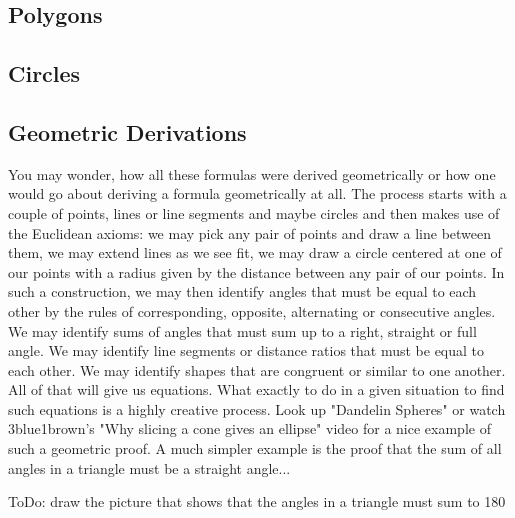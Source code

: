 \subsection{Polygons}

\subsection{Circles}

\subsection{Geometric Derivations}
You may wonder, how all these formulas were derived geometrically or how one would go about deriving a formula geometrically at all. The process starts with a couple of points, lines or line segments and maybe circles and then makes use of the Euclidean axioms: we may pick any pair of points and draw a line between them, we may extend lines as we see fit, we may draw a circle centered at one of our points with a radius given by the distance between any pair of our points. In such a construction, we may then identify angles that must be equal to each other by the rules of corresponding, opposite, alternating or consecutive angles. We may identify sums of angles that must sum up to a right, straight or full angle. We may identify line segments or distance ratios that must be equal to each other. We may identify shapes that are congruent or similar to one another. All of that will give us equations. What exactly to do in a given situation to find such equations is a highly creative process. Look up "Dandelin Spheres" or watch 3blue1brown's "Why slicing a cone gives an ellipse" video for a nice example of such a geometric proof. A much simpler example is the proof that the sum of all angles in a triangle must be a straight angle...


ToDo: draw the picture that shows that the angles in a triangle must sum to 180

